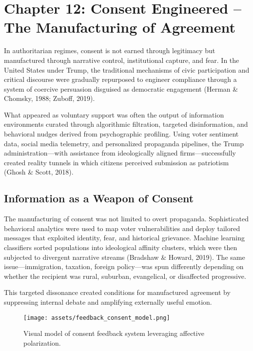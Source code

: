 \documentclass[
]{article}
\author{}
\date{}
\begin{document}
\chapter{Chapter 12: Consent Engineered -- The Manufacturing of Agreement}

In authoritarian regimes, consent is not earned through legitimacy but manufactured through narrative control, institutional capture, and fear. In the United States under Trump, the traditional mechanisms of civic participation and critical discourse were gradually repurposed to engineer compliance through a system of coercive persuasion disguised as democratic engagement (Herman \& Chomsky, 1988; Zuboff, 2019).

What appeared as voluntary support was often the output of information environments curated through algorithmic filtration, targeted disinformation, and behavioral nudges derived from psychographic profiling. Using voter sentiment data, social media telemetry, and personalized propaganda pipelines, the Trump administration---with assistance from ideologically aligned firms---successfully created reality tunnels in which citizens perceived submission as patriotism (Ghosh \& Scott, 2018).

\section*{Information as a Weapon of Consent}

The manufacturing of consent was not limited to overt propaganda. Sophisticated behavioral analytics were used to map voter vulnerabilities and deploy tailored messages that exploited identity, fear, and historical grievance. Machine learning classifiers sorted populations into ideological affinity clusters, which were then subjected to divergent narrative streams (Bradshaw \& Howard, 2019). The same issue---immigration, taxation, foreign policy---was spun differently depending on whether the recipient was rural, suburban, evangelical, or disaffected progressive.

This targeted dissonance created conditions for manufactured agreement by suppressing internal debate and amplifying externally useful emotion.

\begin{figure}[H]
    \centering
    \texttt{[image: assets/feedback\_consent\_model.png]}
    \caption{Visual model of consent feedback system leveraging affective polarization.}
    \label{fig:consent_feedback}
\end{figure}
\end{document}
